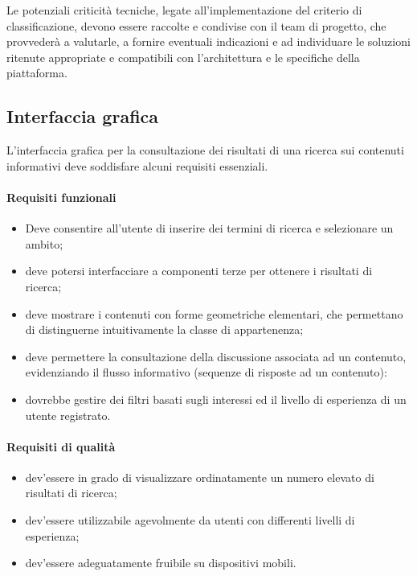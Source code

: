 Le potenziali criticità tecniche, legate all'implementazione del criterio di classificazione, devono essere raccolte e condivise con il team di progetto, che provvederà a valutarle, a fornire eventuali indicazioni e ad individuare le soluzioni ritenute appropriate e compatibili con l'architettura e le specifiche della piattaforma.

\subsection{Interfaccia grafica}
\label{sec:tesi:progetto:requisiti:interfaccia-grafica}
L'interfaccia grafica per la consultazione dei risultati di una ricerca sui contenuti informativi deve soddisfare alcuni requisiti essenziali.

\paragraph{Requisiti funzionali}
\begin{itemize}
	\item Deve consentire all'utente di inserire dei termini di ricerca e selezionare un ambito;
	\item deve potersi interfacciare a componenti terze per ottenere i risultati di ricerca;
	\item deve mostrare i contenuti con forme geometriche elementari, che permettano di distinguerne intuitivamente la classe di appartenenza;
	\item deve permettere la consultazione della discussione associata ad un contenuto, evidenziando il flusso informativo (sequenze di risposte ad un contenuto):
	\item dovrebbe gestire dei filtri basati sugli interessi ed il livello di esperienza di un utente registrato.
\end{itemize}

\paragraph{Requisiti di qualità}
\begin{itemize}
	\item dev'essere in grado di visualizzare ordinatamente un numero elevato di risultati di ricerca;
	\item dev'essere utilizzabile agevolmente da utenti con differenti livelli di esperienza;
	\item dev'essere adeguatamente fruibile su dispositivi mobili.
\end{itemize}
